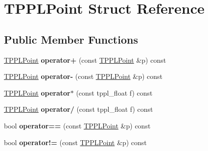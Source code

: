 \hypertarget{struct_t_p_p_l_point}{}\section{T\+P\+P\+L\+Point Struct Reference}
\label{struct_t_p_p_l_point}
\subsection*{Public Member Functions}
\begin{DoxyCompactItemize}
\item 
\mbox{\label{struct_t_p_p_l_point_ac2107ca866f70508867949950b44e68c}} 
\mbox{\hyperlink{struct_t_p_p_l_point}{T\+P\+P\+L\+Point}} {\bfseries operator+} (const \mbox{\hyperlink{struct_t_p_p_l_point}{T\+P\+P\+L\+Point}} \&p) const
\item 
\mbox{\label{struct_t_p_p_l_point_a60c615d464739c172584c7dbfd621e9d}} 
\mbox{\hyperlink{struct_t_p_p_l_point}{T\+P\+P\+L\+Point}} {\bfseries operator-\/} (const \mbox{\hyperlink{struct_t_p_p_l_point}{T\+P\+P\+L\+Point}} \&p) const
\item 
\mbox{\label{struct_t_p_p_l_point_a2557f9d06d319f9dda25448a7e8b5eec}} 
\mbox{\hyperlink{struct_t_p_p_l_point}{T\+P\+P\+L\+Point}} {\bfseries operator$\ast$} (const tppl\+\_\+float f) const
\item 
\mbox{\label{struct_t_p_p_l_point_adf0c3e501361be2fa9d3abbeb0474bae}} 
\mbox{\hyperlink{struct_t_p_p_l_point}{T\+P\+P\+L\+Point}} {\bfseries operator/} (const tppl\+\_\+float f) const
\item 
\mbox{\label{struct_t_p_p_l_point_ad7ccaba2c4af1fdbfe00c7c24fb7ad8c}} 
bool {\bfseries operator==} (const \mbox{\hyperlink{struct_t_p_p_l_point}{T\+P\+P\+L\+Point}} \&p) const
\item 
\mbox{\label{struct_t_p_p_l_point_a4115597e107c485396b4e1668b120a76}} 
bool {\bfseries operator!=} (const \mbox{\hyperlink{struct_t_p_p_l_point}{T\+P\+P\+L\+Point}} \&p) const
\end{DoxyCompactItemize}
